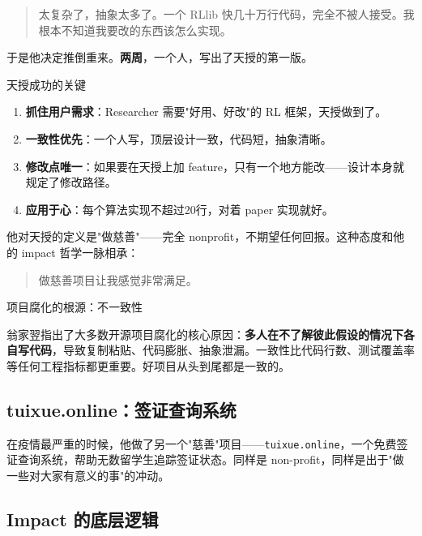 \documentclass[a4paper]{article}
\begin{document}
\begin{quote}
太复杂了，抽象太多了。一个 RLlib 快几十万行代码，完全不被人接受。我根本不知道我要改的东西该怎么实现。
\end{quote}

于是他决定推倒重来。\textbf{两周}，一个人，写出了天授的第一版。

\begin{importantbox}{天授成功的关键}

\begin{enumerate}
\item \textbf{抓住用户需求}：Researcher 需要"好用、好改"的 RL 框架，天授做到了。
\item \textbf{一致性优先}：一个人写，顶层设计一致，代码短，抽象清晰。
\item \textbf{修改点唯一}：如果要在天授上加 feature，只有一个地方能改——设计本身就规定了修改路径。
\item \textbf{应用于心}：每个算法实现不超过20行，对着 paper 实现就好。
\end{enumerate}
\end{importantbox}


他对天授的定义是"做慈善"——完全 nonprofit，不期望任何回报。这种态度和他的 impact 哲学一脉相承：

\begin{quote}
做慈善项目让我感觉非常满足。
\end{quote}

\begin{warningbox}{项目腐化的根源：不一致性}

翁家翌指出了大多数开源项目腐化的核心原因：\textbf{多人在不了解彼此假设的情况下各自写代码}，导致复制粘贴、代码膨胀、抽象泄漏。一致性比代码行数、测试覆盖率等任何工程指标都更重要。好项目从头到尾都是一致的。
\end{warningbox}


\subsection{tuixue.online：签证查询系统}

在疫情最严重的时候，他做了另一个"慈善"项目——\texttt{tuixue.online}，一个免费签证查询系统，帮助无数留学生追踪签证状态。同样是 non-profit，同样是出于"做一些对大家有意义的事"的冲动。

\subsection{Impact 的底层逻辑}
\end{document}
